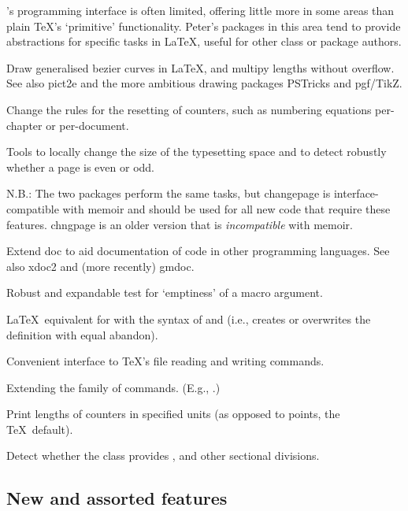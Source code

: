 \documentclass{ltugboat}
\begin{document}
\LaTeXe's programming interface is often limited, offering little more in some areas than plain \TeX's `primitive' functionality. Peter's packages in this area tend to provide abstractions for specific tasks in \LaTeX, useful for other class or package authors.

\begin{description}[font=\normalfont\sffamily]
\item [bez123 \& multiply] Draw generalised bezier curves in \LaTeX, and multipy lengths without overflow. See also \textsf{pict2e} and the more ambitious drawing packages \textsf{PSTricks} and \textsf{pgf/TikZ}.

\item [chngcntr] Change the rules for the resetting of counters, such as numbering equations per-chapter or per-document.
\item [chngpage \& changepage] Tools to locally change the size of the typesetting space and to detect robustly whether a page is even or odd.

N.B.: The two packages perform the same tasks, but \textsf{changepage} is interface-compatible with \textsf{memoir} and should be used for all new code that require these features. \textsf{chngpage} is an older version that is \emph{incompatible} with \textsf{memoir}.

\item [docmfp] Extend \textsf{doc} to aid documentation of code in other programming languages. See also \textsf{xdoc2} and (more recently) \textsf{gmdoc}.

\item [ifmtarg] Robust and expandable test for `emptiness' of a macro argument.
\item [makecmds] \LaTeX\ equivalent for  with the syntax of  and  (i.e., creates or overwrites the definition with equal abandon).
\item [newfile]  Convenient interface to \TeX's file reading and writing commands.
\item [nextpage] Extending the family of  commands. (E.g., .)
\item [printlen] Print lengths of counters in specified units (as opposed to points, the \TeX\ default).
\item [stdclsdv] Detect whether the class provides , and other sectional divisions.
\end{description}

\subsection{New and assorted features}
\end{document}
